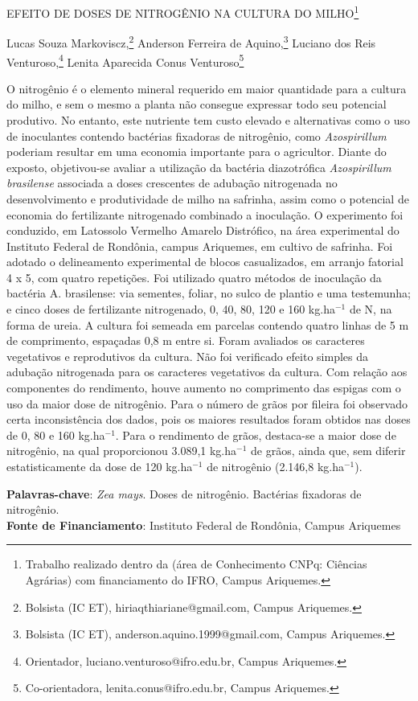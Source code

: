 \documentclass[article,12pt,onesidea,4paper,english,brazil]{abntex2}
\begin{document}
	
	
	\frenchspacing 
	
	\begin{center}
		\LARGE EFEITO DE DOSES DE NITROGÊNIO NA CULTURA DO MILHO\footnote{Trabalho realizado dentro da (área de Conhecimento CNPq: Ciências Agrárias) com financiamento do IFRO, Campus Ariquemes.}
		
		\normalsize
		Lucas Souza Markoviscz,\footnote{Bolsista (IC ET), hiriaqthiariane@gmail.com, Campus Ariquemes.} 
	Anderson Ferreira de Aquino,\footnote{Bolsista (IC ET), anderson.aquino.1999@gmail.com, Campus Ariquemes.} 
		Luciano dos Reis Venturoso,\footnote{Orientador, luciano.venturoso@ifro.edu.br, Campus Ariquemes.} 
		Lenita Aparecida Conus Venturoso\footnote{Co-orientadora, lenita.conus@ifro.edu.br, Campus Ariquemes.} 
	\end{center}
	
	\noindent O nitrogênio é o elemento mineral requerido em maior quantidade para a cultura do milho, e sem o mesmo a planta não consegue expressar todo seu potencial produtivo. No entanto, este nutriente tem custo elevado e alternativas como o uso de inoculantes contendo bactérias fixadoras de nitrogênio, como \textit{Azospirillum} poderiam resultar em uma economia importante para o agricultor. Diante do exposto, objetivou-se avaliar a utilização da bactéria diazotrófica \textit{Azospirillum brasilense} associada a doses crescentes de adubação nitrogenada no desenvolvimento e produtividade de milho na safrinha, assim como o potencial de economia do fertilizante nitrogenado combinado a inoculação. O experimento foi conduzido, em Latossolo Vermelho Amarelo Distrófico, na área experimental do Instituto Federal de Rondônia, campus Ariquemes, em cultivo de safrinha. Foi adotado o delineamento experimental de blocos casualizados, em arranjo fatorial 4 x 5, com quatro repetições. Foi utilizado quatro métodos de inoculação da bactéria A. brasilense: via sementes, foliar, no sulco de plantio e uma testemunha; e cinco doses de fertilizante nitrogenado, 0, 40, 80, 120 e 160 kg.ha$^{-1}$ de N, na forma de ureia. A cultura foi semeada em parcelas contendo quatro linhas de 5 m de comprimento, espaçadas 0,8 m entre si. Foram avaliados os caracteres vegetativos e reprodutivos da cultura. Não foi verificado efeito simples da adubação nitrogenada para os caracteres vegetativos da cultura. Com relação aos componentes do rendimento, houve aumento no comprimento das espigas com o uso da maior dose de nitrogênio. Para o número de grãos por fileira foi observado certa inconsistência dos dados, pois os maiores resultados foram obtidos nas doses de 0, 80 e 160 kg.ha$^{-1}$. Para o rendimento de grãos, destaca-se a maior dose de nitrogênio, na qual proporcionou 3.089,1 kg.ha$^{-1}$ de grãos, ainda que, sem diferir estatisticamente da dose de 120 kg.ha$^{-1}$ de nitrogênio (2.146,8 kg.ha$^{-1}$).
	
	\vspace{\onelineskip}
	
	\noindent
	\textbf{Palavras-chave}: \textit{Zea mays}. Doses de nitrogênio. Bactérias fixadoras de nitrogênio.\\
	\textbf{Fonte de Financiamento}: Instituto Federal de Rondônia, Campus Ariquemes
	
\end{document}
